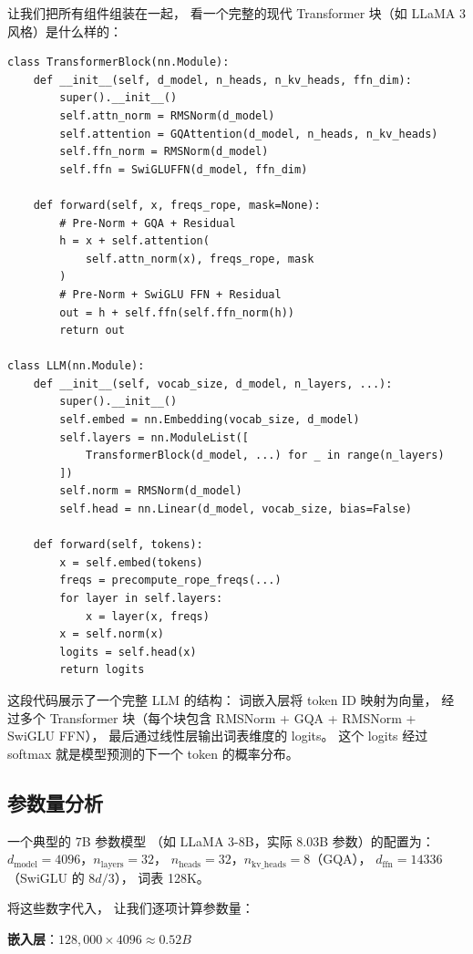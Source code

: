 让我们把所有组件组装在一起，
看一个完整的现代 Transformer 块（如 LLaMA 3 风格）是什么样的：

\begin{lstlisting}[caption={A complete modern Transformer block}]
class TransformerBlock(nn.Module):
    def __init__(self, d_model, n_heads, n_kv_heads, ffn_dim):
        super().__init__()
        self.attn_norm = RMSNorm(d_model)
        self.attention = GQAttention(d_model, n_heads, n_kv_heads)
        self.ffn_norm = RMSNorm(d_model)
        self.ffn = SwiGLUFFN(d_model, ffn_dim)

    def forward(self, x, freqs_rope, mask=None):
        # Pre-Norm + GQA + Residual
        h = x + self.attention(
            self.attn_norm(x), freqs_rope, mask
        )
        # Pre-Norm + SwiGLU FFN + Residual
        out = h + self.ffn(self.ffn_norm(h))
        return out

class LLM(nn.Module):
    def __init__(self, vocab_size, d_model, n_layers, ...):
        super().__init__()
        self.embed = nn.Embedding(vocab_size, d_model)
        self.layers = nn.ModuleList([
            TransformerBlock(d_model, ...) for _ in range(n_layers)
        ])
        self.norm = RMSNorm(d_model)
        self.head = nn.Linear(d_model, vocab_size, bias=False)

    def forward(self, tokens):
        x = self.embed(tokens)
        freqs = precompute_rope_freqs(...)
        for layer in self.layers:
            x = layer(x, freqs)
        x = self.norm(x)
        logits = self.head(x)
        return logits
\end{lstlisting}

这段代码展示了一个完整 LLM 的结构：
词嵌入层将 token ID 映射为向量，
经过多个 Transformer 块（每个块包含 RMSNorm + GQA + RMSNorm + SwiGLU FFN），
最后通过线性层输出词表维度的 logits。
这个 logits 经过 softmax 就是模型预测的下一个 token 的概率分布。

\subsection{参数量分析}

一个典型的 7B 参数模型
（如 LLaMA 3-8B，实际 8.03B 参数）的配置为：
$d_{\mathrm{model}} = 4096$，$n_{\mathrm{layers}} = 32$，
$n_{\mathrm{heads}} = 32$，$n_{\mathrm{kv\_heads}} = 8$（GQA），
$d_{\mathrm{ffn}} = 14336$（SwiGLU 的 $8d/3$），
词表 128K。

将这些数字代入，
让我们逐项计算参数量：

\textbf{嵌入层}：$128{,}000 \times 4096 \approx 0.52B$


